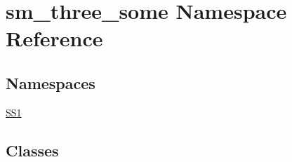 \hypertarget{namespacesm__three__some}{}\section{sm\+\_\+three\+\_\+some Namespace Reference}
\label{namespacesm__three__some}
\subsection*{Namespaces}
\begin{DoxyCompactItemize}
\item 
 \hyperlink{namespacesm__three__some_1_1SS1}{S\+S1}
\end{DoxyCompactItemize}
\subsection*{Classes}
